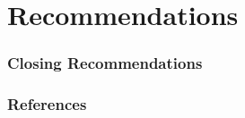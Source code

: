 \documentclass[11pt, 
               aspectratio=169]{beamer}
\begin{document}

	\section{Recommendations}

	\begin{frame}
		\frametitle{Closing Recommendations}
	\end{frame}




	\begin{frame}
		\frametitle{References}
		\printbibliography
	\end{frame}
\end{document}
